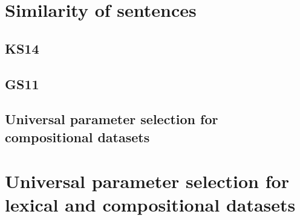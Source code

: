 \section{Similarity of sentences}
\label{sec:sentential}

\subsection{KS14}
\label{sec:ks14}



\subsection{GS11}
\label{sec:gs11}




\subsection{Universal parameter selection for compositional datasets}
\label{sec:robust-param-comp-selecion}

\section{Universal parameter selection for lexical and compositional datasets}
\label{sec:universal-param-selection}






